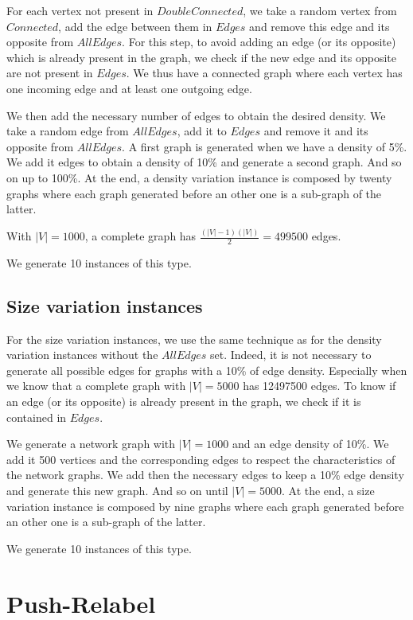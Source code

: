 For each vertex not present in $DoubleConnected$, we take a random vertex from $Connected$, add the edge between them in $Edges$ and remove this edge and its opposite from $AllEdges$. For this step, to avoid adding an edge (or its opposite) which is already present in the graph, we check if the new edge and its opposite are not present in $Edges$. We thus have a connected graph where each vertex has one incoming edge and at least one outgoing edge.

We then add the necessary number of edges to obtain the desired density. We take a random edge from $AllEdges$, add it to $Edges$ and remove it and its opposite from $AllEdges$. A first graph is generated when we have a density of 5\%. We add it edges to obtain a density of 10\% and generate a second graph. And so on up to 100\%. At the end, a density variation instance is composed by twenty graphs where each graph generated before an other one is a sub-graph of the latter.

With $|V|=1000$, a complete graph has $\frac{(|V|-1)(|V|)}{2} = 499500$ edges.

We generate 10 instances of this type.

\subsection{Size variation instances}
For the size variation instances, we use the same technique as for the density variation instances without the $AllEdges$ set. Indeed, it is not necessary to generate all possible edges for graphs with a 10\% of edge density. Especially when we know that a complete graph with $|V|=5000$ has 12497500 edges. To know if an edge (or its opposite) is already present in the graph, we check if it is contained in $Edges$.

We generate a network graph with $|V|=1000$ and an edge density of 10\%. We add it 500 vertices and the corresponding edges to respect the characteristics of the network graphs. We add then the necessary edges to keep a 10\% edge density and generate this new graph. And so on until $|V|=5000$. At the end, a size variation instance is composed by nine graphs where each graph generated before an other one is a sub-graph of the latter.

We generate 10 instances of this type.

\section{Push-Relabel}

